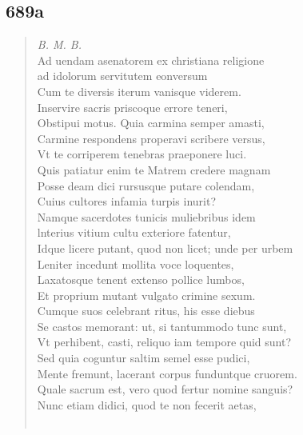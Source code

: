 \documentclass[11pt, a4paper]{report}
\begin{document}
            \subsection*{689a}
      \begin{verse}
      \textit{B. M. B.} \\ Ad uendam asenatorem ex christiana religione \\ ad idolorum servitutem eonversum \\ Cum te diversis iterum vanisque viderem. \\ Inservire sacris priscoque errore teneri, \\ Obstipui motus. Quia carmina semper amasti, \\ Carmine respondens properavi scribere versus, \\ Vt te corriperem tenebras praeponere luci. \\ Quis patiatur enim te Matrem credere magnam \\ Posse deam dici rursusque putare colendam, \\ Cuius cultores infamia turpis inurit? \\ Namque sacerdotes tunicis muliebribus idem \\ lnterius vitium cultu exteriore fatentur, \\ Idque licere putant, quod non licet; unde per urbem \\ Leniter incedunt mollita voce loquentes, \\ Laxatosque tenent extenso pollice lumbos, \\ Et proprium mutant vulgato crimine sexum. \\ Cumque suos celebrant ritus, his esse diebus \\ Se castos memorant: ut, si tantummodo tunc sunt, \\ Vt perhibent, casti, reliquo iam tempore quid sunt? \\ Sed quia coguntur saltim semel esse pudici, \\ Mente fremunt, lacerant corpus funduntque cruorem. \\ Quale sacrum est, vero quod fertur nomine sanguis? \\ Nunc etiam didici, quod te non fecerit aetas, \\ 
        ﻿\pagebreak 

\end{verse}
\end{document}
